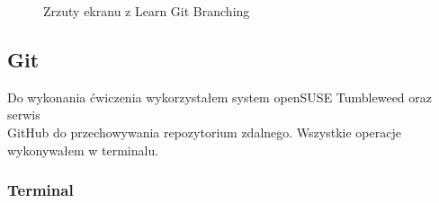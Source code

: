 \documentclass[a4paper,12pt]{article}
\begin{document}
\begin{figure}[!ht]
    \centering
    \vfill
    \caption{Zrzuty ekranu z Learn Git Branching}
\end{figure}

\newpage

\subsection{Git}
Do wykonania ćwiczenia wykorzystałem system openSUSE Tumbleweed \cite{noauthor_opensuse_nodate} oraz serwis \\ GitHub \cite{noauthor_github:_nodate} do przechowywania repozytorium zdalnego. Wszystkie operacje wykonywałem w terminalu.
\subsubsection{Terminal}
\end{document}
